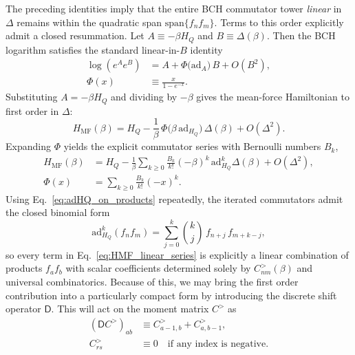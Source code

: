 The preceding identities imply that the entire BCH commutator tower \emph{linear} in $\Delta$ remains within the quadratic span $\mathrm{span}\{f_nf_m\}$. Terms to this order explicitly admit a closed resummation. Let $A\equiv-\beta H_Q$ and $B\equiv \Delta(\beta)$. Then the BCH logarithm satisfies the standard
linear-in-$B$ identity~\cite{wilcoxExponentialOperatorsParameter1967a,weiLieAlgebraicSolution1963}
\begin{equation}
    \label{eq:BCH_linear_resum}
    \begin{split}
        \log\!\left(e^{A}e^{B}\right) & = A+\Phi\!\big(\mathrm{ad}_{A}\big)\,B+O(B^2), \\
        \Phi(x)                       & \equiv \frac{x}{1-e^{-x}}.
    \end{split}
\end{equation}
Substituting $A=-\beta H_Q$ and dividing by $-\beta$ gives the mean-force Hamiltonian
to first order in $\Delta$:
\begin{equation}
    \label{eq:HMF_linear_resum}
    H_{\mathrm{MF}}(\beta) = H_Q - \frac{1}{\beta}\,\Phi\!\big(\beta\,\mathrm{ad}_{H_Q}\big)\,\Delta(\beta)+O(\Delta^2).
\end{equation}
Expanding $\Phi$ yields the explicit commutator series with Bernoulli numbers $B_k$,
\begin{equation}
    \label{eq:HMF_linear_series}
    \begin{split}
        H_{\mathrm{MF}}(\beta) & = H_Q - \frac{1}{\beta}\sum_{k\ge 0}\frac{B_k}{k!}(-\beta)^k\,\mathrm{ad}_{H_Q}^k\Delta(\beta) + O(\Delta^2), \\
        \Phi(x)                & = \sum_{k\ge 0}\frac{B_k}{k!}(-x)^k.
    \end{split}
\end{equation}
Using Eq.~\eqref{eq:adHQ_on_products} repeatedly, the iterated commutators admit the closed binomial form
\begin{equation}
    \label{eq:adHQk_on_products}
    \mathrm{ad}_{H_Q}^{k}(f_n f_m)
    =\sum_{j=0}^{k}\binom{k}{j}\, f_{n+j}\, f_{m+k-j},
\end{equation}
so every term in Eq.~\eqref{eq:HMF_linear_series} is explicitly a linear combination of products $f_af_b$
with scalar coefficients determined solely by $C^{>}_{nm}(\beta)$ and universal combinatorics. Because of this, we may bring the first order contribution into a particularly compact form by introducing the discrete shift operator $\mathsf D$. This will act on the moment matrix $C^{>}$ as
\begin{equation}
    \label{eq:D_operator_on_C}
    \begin{split}
        (\mathsf D C^{>})_{ab} & \equiv C^{>}_{a-1,b}+C^{>}_{a,b-1},                    \\
        C^{>}_{rs}             & \equiv 0\quad \text{if any index is negative}.
    \end{split}
\end{equation}

